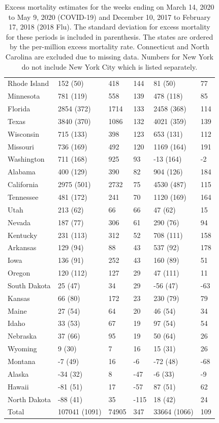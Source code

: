 \documentclass[11pt]{article}
\begin{document}
\begin{table}
\begin{tabular}{|l|lll|ll|}
  Rhode Island & 152 (50) & 418 & 144 & 81 (50) & 77 \\ 
  Minnesota & 781 (119) & 558 & 139 & 478 (118) & 85 \\ 
  Florida & 2854 (372) & 1714 & 133 & 2458 (368) & 114 \\ 
  Texas & 3840 (370) & 1086 & 132 & 4021 (359) & 139 \\ 
  Wisconsin & 715 (133) & 398 & 123 & 653 (131) & 112 \\ 
  Missouri & 736 (169) & 492 & 120 & 1169 (164) & 191 \\ 
  Washington & 711 (168) & 925 & 93 & -13 (164) & -2 \\ 
  Alabama & 400 (129) & 390 & 82 & 904 (126) & 184 \\ 
  California & 2975 (501) & 2732 & 75 & 4530 (487) & 115 \\ 
  Tennessee & 481 (172) & 241 & 70 & 1120 (169) & 164 \\ 
  Utah & 213 (62) & 66 & 66 & 47 (62) & 15 \\ 
  Nevada & 187 (77) & 306 & 61 & 290 (76) & 94 \\ 
  Kentucky & 231 (113) & 312 & 52 & 708 (111) & 158 \\ 
  Arkansas & 129 (94) & 88 & 43 & 537 (92) & 178 \\ 
  Iowa & 136 (91) & 252 & 43 & 160 (89) & 51 \\ 
  Oregon & 120 (112) & 127 & 29 & 47 (111) & 11 \\ 
  South Dakota & 25 (47) & 34 & 29 & -56 (47) & -63 \\ 
  Kansas & 66 (80) & 172 & 23 & 230 (79) & 79 \\ 
  Maine & 27 (54) & 64 & 20 & 46 (54) & 34 \\ 
  Idaho & 33 (53) & 67 & 19 & 97 (54) & 54 \\ 
  Nebraska & 37 (66) & 95 & 19 & 50 (64) & 26 \\ 
  Wyoming & 9 (30) & 7 & 16 & 15 (31) & 26 \\ 
  Montana & -7 (49) & 16 & -6 & -72 (48) & -68 \\ 
  Alaska & -34 (32) & 8 & -47 & -6 (33) & -9 \\ 
  Hawaii & -81 (51) & 17 & -57 & 87 (51) & 62 \\ 
  North Dakota & -88 (41) & 35 & -115 & 18 (42) & 24 \\ 
 \hline
  Total & 107041 (1091) & 74905 & 347 & 33664 (1066) & 109 \\ 
  \hline
 \end{tabular}
 \caption{Excess mortality estimates for the weeks ending on March 14, 2020 to May 9, 2020 (COVID-19) and  December 10, 2017 to February 17, 2018 (2018 Flu). The standard deviation for excess mortality for these periods is included in parenthesis. The states are ordered by the per-million excess mortality rate. Connecticut and North Carolina are excluded due to missing data. Numbers for New York do not include New York City which is listed separately.}
 \label{tab:covid19-states}
 \normalsize
\end{table}
 
\end{document}
